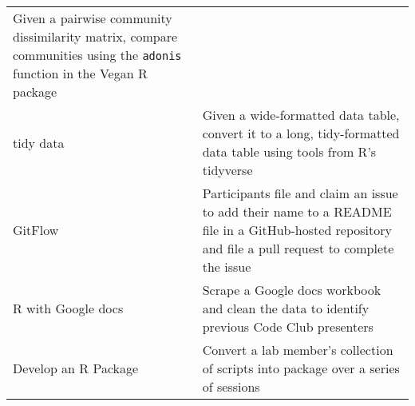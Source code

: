 \documentclass[
  11pt,
]{article}
\begin{document}
\begin{longtable}[]{@{}ll@{}}
\begin{minipage}[t]{0.69\columnwidth}
Given a pairwise community dissimilarity matrix, compare communities
using the \texttt{adonis} function in the Vegan R package\strut
\end{minipage}\tabularnewline
\begin{minipage}[t]{0.25\columnwidth}\raggedright
tidy data\strut
\end{minipage} & \begin{minipage}[t]{0.69\columnwidth}\raggedright
Given a wide-formatted data table, convert it to a long, tidy-formatted
data table using tools from R's tidyverse\strut
\end{minipage}\tabularnewline
\begin{minipage}[t]{0.25\columnwidth}\raggedright
GitFlow\strut
\end{minipage} & \begin{minipage}[t]{0.69\columnwidth}\raggedright
Participants file and claim an issue to add their name to a README file
in a GitHub-hosted repository and file a pull request to complete the
issue\strut
\end{minipage}\tabularnewline
\begin{minipage}[t]{0.25\columnwidth}\raggedright
R with Google docs\strut
\end{minipage} & \begin{minipage}[t]{0.69\columnwidth}\raggedright
Scrape a Google docs workbook and clean the data to identify previous
Code Club presenters\strut
\end{minipage}\tabularnewline
\begin{minipage}[t]{0.25\columnwidth}\raggedright
Develop an R Package\strut
\end{minipage} & \begin{minipage}[t]{0.69\columnwidth}\raggedright
Convert a lab member's collection of scripts into package over a series
of sessions\strut
\end{minipage}\tabularnewline
\bottomrule
\end{longtable}
\end{document}
